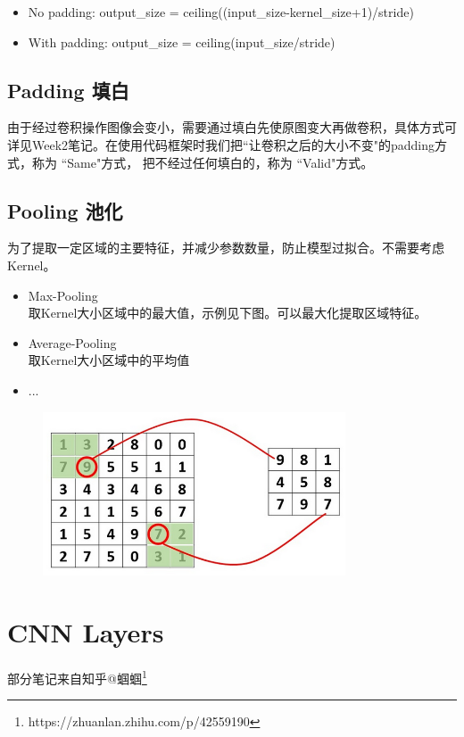 \documentclass[11pt]{article}
\begin{document}
\begin{itemize}
  \item No padding: output\_size = ceiling((input\_size-kernel\_size+1)/stride)
  \item With padding: output\_size = ceiling(input\_size/stride)
\end{itemize}


\subsection{Padding 填白}
由于经过卷积操作图像会变小，需要通过填白先使原图变大再做卷积，具体方式可详见Week2笔记。在使用代码框架时我们把``让卷积之后的大小不变"的padding方式，称为 ``Same"方式， 把不经过任何填白的，称为 ``Valid"方式。


\subsection{Pooling 池化}
为了提取一定区域的主要特征，并减少参数数量，防止模型过拟合。不需要考虑Kernel。
\begin{itemize}
  \item Max-Pooling\\
        取Kernel大小区域中的最大值，示例见下图。可以最大化提取区域特征。
  \item Average-Pooling\\
        取Kernel大小区域中的平均值
  \item ...
\end{itemize}

\begin{figure}[hbt!]
  \centering
  \includegraphics[width=0.8\textwidth]{assets/maxp.png}
\end{figure}


\section{CNN Layers}
部分笔记来自知乎@蝈蝈\footnote{https://zhuanlan.zhihu.com/p/42559190}
\end{document}
